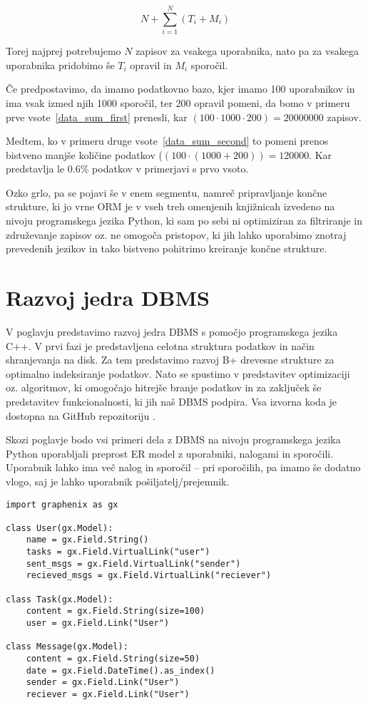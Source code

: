 \documentclass[a4paper,12pt,openright]{book}
\begin{document}
    \begin{equation}
        N + \sum_{i=1}^{N} (T_i + M_i)
    \label{data_sum_second}
    \end{equation}

    \noindent
    Torej najprej potrebujemo $N$ zapisov za vsakega uporabnika, nato pa za vsakega uporabnika pridobimo še $T_i$ opravil in $M_i$ sporočil.
    
    Če predpostavimo, da imamo podatkovno bazo, kjer imamo \num{100} uporabnikov in ima vsak izmed njih \num{1000} sporočil, ter \num{200} opravil pomeni, da bomo v primeru prve vsote~\eqref{data_sum_first} prenesli, kar $(100 \cdot 1000 \cdot 200) = \num{20000000}$ zapisov.

    Medtem, ko v primeru druge vsote~\eqref{data_sum_second} to pomeni prenos bistveno manjše količine podatkov ($(100 \cdot (1000 + 200)) = \num{120000}$. Kar predstavlja le $0.6\%$ podatkov v primerjavi s prvo vsoto.

    Ozko grlo, pa se pojavi še v enem segmentu, namreč pripravljanje končne strukture, ki jo vrne ORM je v vseh treh omenjenih knjižnicah izvedeno na nivoju programskega jezika Python, ki sam po sebi ni optimiziran za filtriranje in združevanje zapisov oz. ne omogoča pristopov, ki jih lahko uporabimo znotraj prevedenih jezikov in tako bistveno pohitrimo kreiranje končne strukture.

\chapter{Razvoj jedra DBMS}
\label{ch0}
    V poglavju predstavimo razvoj jedra DBMS s pomočjo programskega jezika C++. V prvi fazi je predstavljena celotna struktura podatkov in način shranjevanja na disk. Za tem predstavimo razvoj B+ drevesne strukture za optimalno indeksiranje podatkov. Nato se spustimo v predstavitev optimizaciji oz. algoritmov, ki omogočajo hitrejše branje podatkov in za zaključek še predstavitev funkcionalnosti, ki jih naš DBMS podpira.
    \newline
    \newline
    \noindent
    Vsa izvorna koda je dostopna na GitHub repozitoriju \cite{GRAPHENIX_GITHUB}.

    \newpage
    \noindent
    Skozi poglavje bodo vsi primeri dela z DBMS na nivoju programskega jezika Python uporabljali preprost ER model z uporabniki, nalogami in sporočili. Uporabnik lahko ima več nalog in sporočil – pri sporočilih, pa imamo še dodatno vlogo, saj je lahko uporabnik pošiljatelj/prejemnik.
\begin{verbatim}
import graphenix as gx

class User(gx.Model):
    name = gx.Field.String()
    tasks = gx.Field.VirtualLink("user")
    sent_msgs = gx.Field.VirtualLink("sender")
    recieved_msgs = gx.Field.VirtualLink("reciever")

class Task(gx.Model):
    content = gx.Field.String(size=100)
    user = gx.Field.Link("User")

class Message(gx.Model):
    content = gx.Field.String(size=50)
    date = gx.Field.DateTime().as_index()
    sender = gx.Field.Link("User")
    reciever = gx.Field.Link("User")
\end{verbatim}
    
\end{document}
